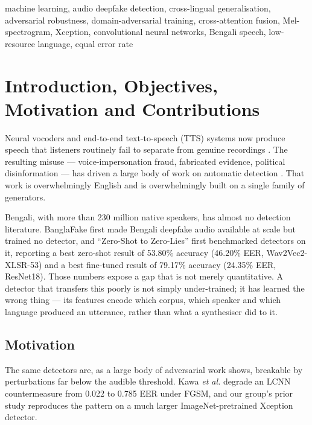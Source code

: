 \documentclass[conference]{IEEEtran}
\renewcommand{\cite}[1]{\unskip}
\begin{document}
\begin{IEEEkeywords}
machine learning, audio deepfake detection, cross-lingual generalisation,
adversarial robustness, domain-adversarial training, cross-attention fusion,
Mel-spectrogram, Xception, convolutional neural networks, Bengali speech,
low-resource language, equal error rate
\end{IEEEkeywords}

\section{Introduction, Objectives, Motivation and Contributions}
Neural vocoders and end-to-end text-to-speech (TTS) systems now produce speech
that listeners routinely fail to separate from genuine recordings
\cite{kong2020hifigan,kumar2019melgan,prenger2019waveglow,yamamoto2020pwg,kim2021vits}.
The resulting misuse --- voice-impersonation fraud, fabricated evidence,
political disinformation --- has driven a large body of work on automatic
detection \cite{todisco2019asvspoof,frank2021wavefake}. That work is
overwhelmingly English and is overwhelmingly built on a single family of
generators.

Bengali, with more than 230 million native speakers, has almost no detection
literature. BanglaFake \cite{fahad2025banglafake} first made Bengali deepfake
audio available at scale but trained no detector, and ``Zero-Shot to
Zero-Lies'' \cite{samu2025zeroshot} first benchmarked detectors on it,
reporting a best zero-shot result of 53.80\% accuracy (46.20\% EER,
Wav2Vec2-XLSR-53) and a best fine-tuned result of 79.17\% accuracy (24.35\%
EER, ResNet18). Those numbers expose a gap that is not merely quantitative. A
detector that transfers this poorly is not simply under-trained; it has
learned the wrong thing --- its features encode which corpus, which speaker
and which language produced an utterance, rather than what a synthesiser did
to it.

\subsection{Motivation}
The same detectors are, as a large body of adversarial work shows, breakable
by perturbations far below the audible threshold. Kawa \emph{et al.}
\cite{kawa2023lcnn} degrade an LCNN countermeasure from 0.022 to 0.785 EER
under FGSM, and our group's prior study \cite{ahmed2026melspec} reproduces the
pattern on a much larger ImageNet-pretrained Xception detector.
\end{document}
